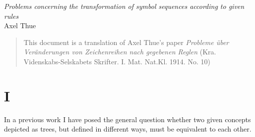 


\titleformat{\section}[hang]{\normalfont\huge}{\thesection}{1em}{\filcenter\S\;}[]

\titleformat{\subsection}[hang]{\Large\sffamily}{\thesubsection}{1em}{\filcenter}[]


\newcommand\UseKEquationNumbering{
  \renewcommand{\theequation}{K}
}

\newcommand\UseGreekEquationNumbering{
  \renewcommand{\theequation}{\greek{equation}}
  \setcounter{equation}{0}
}

\newtheorem{problem}{Problem}
\renewcommand{\theproblem}{(\Roman{problem})}

\setcounter{page}{493}
\newcommand\mypage[1]{\newpage}






\noindent
{\Large\em Problems concerning the transformation of
symbol sequences according to given rules}\\

\medskip
\noindent
Axel Thue

\medskip
{}\marginnote{\today}


\begin{abstract}
\noindent This document is a translation of Axel Thue's paper 
  \emph{Probleme
  \"uber Ver\"anderungen von Zeichenreihen nach gegebenen Reglen}
(Kra. Videnskabs-Selskabets
Skrifter. I. Mat. Nat.Kl. 1914. No. 10)
\end{abstract}


\section{I}\label{sec:one} 

In a previous work I have posed the general
question whether two given concepts depicted as trees, but defined in
different ways, must be equivalent to each other.

